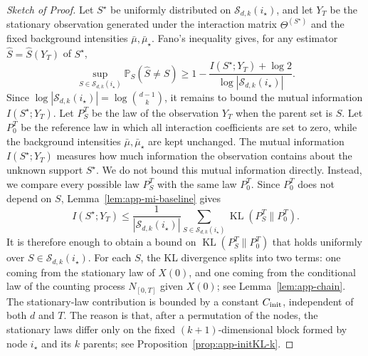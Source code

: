 \documentclass{article}
\newcommand{\KL}{\operatorname{KL}}
\newcommand{\Pbb}{\mathbb{P}}
\begin{document}
\begin{proof}[Sketch of Proof]

Let $S^\star$ be uniformly distributed on
$\mathcal S_{d,k}(i_\star)$, and let $Y_T$ be the stationary observation generated under the interaction matrix $\Theta^{(S^\star)}$ and the fixed background intensities $\bar\mu,\bar\mu_\star$. 
Fano's inequality gives, for any estimator $\widehat S=\widehat S(Y_T)$ of $S^\star$,
\[
\sup_{S\in\mathcal S_{d,k}(i_\star)}
\Pbb_S(\widehat S\neq S)
\ge
1-\frac{I(S^\star;Y_T)+\log 2}
{\log |\mathcal S_{d,k}(i_\star)|}.
\]
Since $
\log |\mathcal S_{d,k}(i_\star)|
=
\log{\binom{d-1}{k}}$, it remains to bound the mutual information $I(S^\star;Y_T)$. 
Let $P_S^T$ be the law of the observation $Y_T$ when the parent set is $S$. Let $P_0^T$ be the reference law in which all interaction coefficients are set to zero, while the background intensities $\bar\mu,\bar\mu_\star$ are kept unchanged. The mutual information $I(S^\star;Y_T)$ measures how much information the observation contains about the unknown support $S^\star$. We do not bound this mutual information directly. Instead, we compare every possible law $P_S^T$ with the same law $P_0^T$. Since $P_0^T$ does not depend on $S$, Lemma~\ref{lem:app-mi-baseline} gives
\begin{equation}
I(S^\star;Y_T)
\le
\frac{1}{|\mathcal S_{d,k}(i_\star)|}
\sum_{S\in\mathcal S_{d,k}(i_\star)}
\KL(P_S^T\|P_0^T).
\label{eq:mi-reference-bound}
\end{equation}
It is therefore enough to obtain a bound on $\KL(P_S^T\|P_0^T)$ that holds uniformly over $S\in\mathcal S_{d,k}(i_\star)$.
For each $S$, the KL divergence splits into two terms: one coming from the stationary law of $X(0)$, and one coming from the conditional law of the counting process $N_{[0,T]}$ given $X(0)$; see Lemma~\ref{lem:app-chain}. The stationary-law contribution is bounded by a constant $C_{\rm init}$, independent of both $d$ and $T$. The reason is that, after a permutation of the nodes, the stationary laws differ only on the fixed $(k+1)$-dimensional block formed by node $i_\star$ and its $k$ parents; see Proposition~\ref{prop:app-initKL-k}.


\end{proof}
\end{document}
